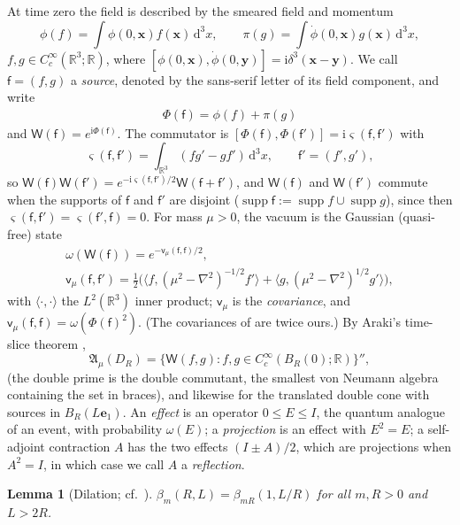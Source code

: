 \documentclass[aps,prl,reprint,longbibliography,raggedbottom]{revtex4-2}
\newtheorem{lemma}{Lemma}
\newcommand{\R}{\mathbb R}
\newcommand{\ii}{\mathrm i}
\newcommand{\dd}{\,\mathrm d}
\newcommand{\ip}[2]{\langle #1,#2\rangle}
\DeclareMathOperator{\supp}{supp}
\newcommand{\A}{\mathfrak A}
\newcommand{\cov}{\mathsf v}
\newcommand{\sx}{\mathsf f}
\newcommand{\sy}{\mathsf f'}
\newcommand{\bx}{\mathbf x}
\newcommand{\by}{\mathbf y}
\newcommand{\eone}{\mathbf e_1}
\newcommand{\Weyl}{\mathsf W}
\begin{document}
At time zero the field is described by the smeared field and momentum
\[
\phi(f)=\int\phi(0,\bx)f(\bx)\dd^3x,\qquad
\pi(g)=\int\dot\phi(0,\bx)g(\bx)\dd^3x,
\]
$f,g\in C_c^\infty(\R^3;\R)$, where
$[\phi(0,\bx),\dot\phi(0,\by)]=\ii\delta^3(\bx-\by)$. We call $\sx=(f,g)$ a
\emph{source}, denoted by the sans-serif letter of its field component,
and write 
\begin{align}\label{eq:comm}
\Phi(\sx)=\phi(f)+\pi(g)
\end{align} and
$\Weyl(\sx)=e^{\ii\Phi(\sx)}$. The commutator is
$[\Phi(\sx),\Phi(\sy)]=\ii\varsigma(\sx,\sy)$ with
\begin{equation}
\varsigma(\sx,\sy)=\int_{\R^3}(fg'-gf')\dd^3x,\qquad \sy=(f',g'),
\label{eq:symplectic}
\end{equation}
so $\Weyl(\sx)\Weyl(\sy)=e^{-\ii\varsigma(\sx,\sy)/2}\Weyl(\sx+\sy)$, and
$\Weyl(\sx)$ and $\Weyl(\sy)$ commute when the supports of $\sx$ and
$\sy$ are disjoint ($\supp\sx:=\supp f\cup\supp g$), since then
$\varsigma(\sx,\sy)=\varsigma(\sy,\sx)=0$. For mass
$\mu>0$, the vacuum is the
Gaussian (quasi-free) state \cite{Haag96}
\begin{equation}
\begin{gathered}
\omega(\Weyl(\sx))=e^{-\cov_\mu(\sx,\sx)/2},\\
\cov_\mu(\sx,\sy)=\tfrac12\bigl(\ip f{(\mu^2-\nabla^2)^{-1/2}f'}+\ip g{(\mu^2-\nabla^2)^{1/2}g'}\bigr),
\end{gathered}
\label{eq:covariance}
\end{equation}
with $\ip\cdot\cdot$ the $L^2(\R^3)$ inner product; $\cov_\mu$ is the
\emph{covariance}, and $\cov_\mu(\sx,\sx)=\omega(\Phi(\sx)^2)$. (The
covariances of \cite{SLW18} are twice ours.) By Araki's time-slice
theorem \cite{Araki64,EO73},
\begin{equation}
\A_\mu(D_R)=\{\Weyl(f,g):f,g\in C_c^\infty(B_R(0);\R)\}'' ,
\label{eq:time-slice}
\end{equation}
(the double prime is the double commutant, the smallest von Neumann
algebra containing the set in braces), and likewise for the translated
double cone with sources in
$B_R(L\eone)$. An \emph{effect} is an operator $0\le E\le I$, the
quantum analogue of an event, with probability $\omega(E)$; a
\emph{projection} is an effect with $E^2=E$; a self-adjoint
contraction $A$ has the two effects $(I\pm A)/2$, which are projections
when $A^2=I$, in which case we call $A$ a \emph{reflection}.

\begin{lemma}[Dilation; cf.~{\cite[Section~2]{BV98}}]\label{lem:scaling}
$\beta_m(R,L)=\beta_{mR}(1,L/R)$ for all $m,R>0$ and $L>2R$.
\end{lemma}
\end{document}
